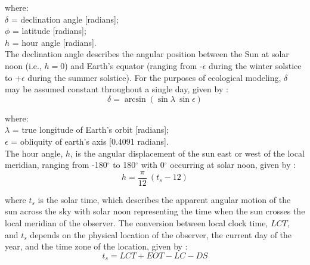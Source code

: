 \noindent where:\\
\indent $\delta$ = declination angle [radians];\\
\indent $\phi$ = latitude [radians];\\
\indent $h$ = hour angle [radians].\\

The declination angle describes the angular position between the Sun at solar noon (i.e., $h=0$) and Earth's equator (ranging from -$\epsilon$ during the winter solstice to +$\epsilon$ during the summer solstice). 
For the purposes of ecological modeling, $\delta$ may be assumed constant throughout a single day, given by \parencite{woolf68}:
\begin{equation}
\label{eq:delta}
    \delta = \arcsin\left(\sin\lambda\: \sin\epsilon\right)
\end{equation}

\noindent where: \\
\indent $\lambda$ = true longitude of Earth's orbit [radians];\\
\indent $\epsilon$ = obliquity of earth's axis [0.4091 radians].\\

The hour angle, $h$, is the angular displacement of the sun east or west of the local meridian, ranging from -180$^{\circ}$ to 180$^{\circ}$ with 0$^{\circ}$ occurring at solar noon, given by \parencite[Eq. 3.1]{stine01}:
\begin{equation}
\label{eq:hour}
    h = \frac{\pi}{12} \: (t_{s} - 12)
\end{equation}

\noindent where $t_{s}$ is the solar time, which describes the apparent angular motion of the sun across the sky with solar noon representing the time when the sun crosses the local meridian of the observer. 
The conversion between local clock time, $LCT$, and $t_{s}$ depends on the physical location of the observer, the current day of the year, and the time zone of the location, given by \parencite[Eq. 3.5]{stine01}:
\begin{equation}
\label{eq:soltime}
    t_{s} = LCT + EOT - LC - DS
\end{equation}

